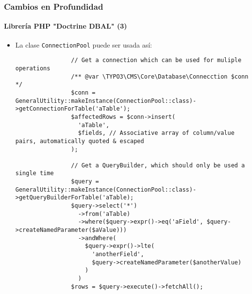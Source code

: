 \begin{frame}[fragile]
	\frametitle{Cambios en Profundidad}
	\framesubtitle{Librería PHP "Doctrine DBAL" (3)}

	\lstset{basicstyle=\tiny\ttfamily}

	\begin{itemize}

		\item La clase \texttt{ConnectionPool} puede ser usada así:
			\begin{lstlisting}
				// Get a connection which can be used for muliple operations
				/** @var \TYPO3\CMS\Core\Database\Connecction $conn */
				$conn = GeneralUtility::makeInstance(ConnectionPool::class)->getConnectionForTable('aTable');
				$affectedRows = $conn->insert(
				  'aTable',
				  $fields, // Associative array of column/value pairs, automatically quoted & escaped
				);

				// Get a QueryBuilder, which should only be used a single time
				$query = GeneralUtility::makeInstance(ConnectionPool::class)->getQueryBuilderForTable('aTable);
				$query->select('*')
				  ->from('aTable)
				  ->where($query->expr()->eq('aField', $query->createNamedParameter($aValue)))
				  ->andWhere(
					$query->expr()->lte(
					  'anotherField',
					  $query->createNamedParameter($anotherValue)
					)
				  )
				$rows = $query->execute()->fetchAll();
			\end{lstlisting}
	\end{itemize}

\end{frame}

